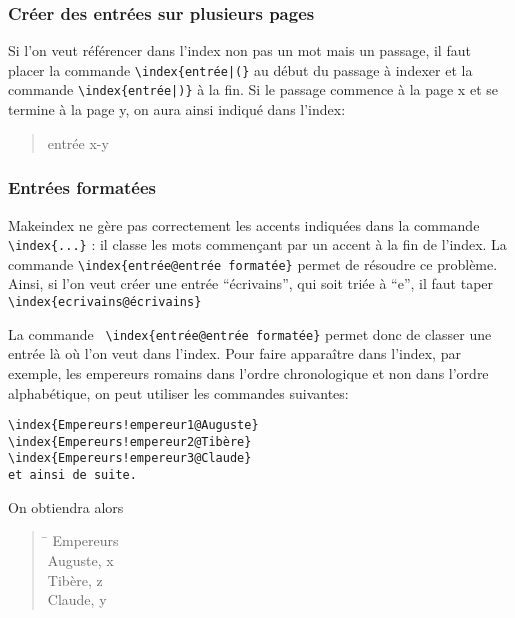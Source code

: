   

\subsubsection{Créer des entrées sur plusieurs pages}

Si l'on veut référencer dans l'index non pas un mot mais un passage, il faut placer la commande \verb+\index{entrée|(}+ au début du passage à indexer et la commande  \verb+\index{entrée|)}+ à la fin. Si le passage commence à la page x et se termine à la page y, on aura ainsi indiqué dans l'index: 

\begin{quotation}
entrée x-y
\end{quotation}


\subsubsection{Entrées formatées}

Makeindex ne gère pas correctement les accents indiquées dans la commande \verb+\index{...}+ : il classe les mots commençant par un accent à la fin de l'index. La commande \verb+\index{entrée@entrée formatée}+ permet de résoudre ce problème. Ainsi, si l'on veut créer une entrée \enquote{écrivains}, qui soit triée à \enquote{e}, il faut taper \verb+\index{ecrivains@écrivains}+

La commande \verb+ \index{entrée@entrée formatée}+ permet donc de classer une entrée là où l'on veut dans l'index. Pour faire apparaître dans l'index, par exemple, les empereurs romains dans l'ordre chronologique et non dans l'ordre alphabétique, on peut utiliser les commandes suivantes:

\begin{verbatim}
\index{Empereurs!empereur1@Auguste}
\index{Empereurs!empereur2@Tibère}
\index{Empereurs!empereur3@Claude}
et ainsi de suite. 
\end{verbatim}

On obtiendra alors
\begin{quotation}
\begin{tabbing}
\hspace{0,5cm} \= \kill
Empereurs\\
\> Auguste, x\\
\> Tibère, z\\
\> Claude, y \\

\end{tabbing}
\end{quotation}

